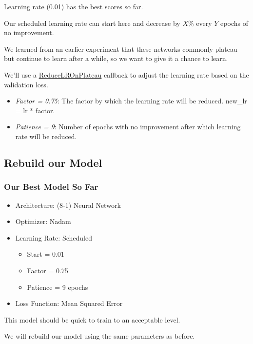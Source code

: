 \documentclass[11pt]{article}
\providecommand{\tightlist}{%
      \setlength{\itemsep}{0pt}\setlength{\parskip}{0pt}}
\begin{document}
Learning rate (0.01) has the best scores so far.

Our scheduled learning rate can start here and decrease by \(X\)\% every
\(Y\) epochs of no improvement.

We learned from an earlier experiment that these networks commonly
plateau but continue to learn after a while, so we want to give it a
chance to learn.

We'll use a
\href{https://keras.io/api/callbacks/reduce_lr_on_plateau/}{ReduceLROnPlateau}
callback to adjust the learning rate based on the validation loss.

\begin{itemize}
\tightlist
\item
  \emph{Factor = 0.75}: The factor by which the learning rate will be
  reduced. new\_lr = lr * factor.
\item
  \emph{Patience = 9}: Number of epochs with no improvement after which
  learning rate will be reduced.
\end{itemize}

    \subsection{Rebuild our Model}\label{rebuild-our-model}

\subsubsection{Our Best Model So Far}\label{our-best-model-so-far}

\begin{itemize}
\tightlist
\item
  Architecture: (8-1) Neural Network
\item
  Optimizer: Nadam
\item
  Learning Rate: Scheduled

  \begin{itemize}
  \tightlist
  \item
    Start = 0.01
  \item
    Factor = 0.75
  \item
    Patience = 9 epochs
  \end{itemize}
\item
  Loss Function: Mean Squared Error
\end{itemize}

This model should be quick to train to an acceptable level.

We will rebuild our model using the same parameters as before.
\end{document}

